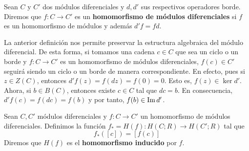 \begin{definicion}
	Sean $C$ y $C'$ dos módulos diferenciales y $d, d'$ sus respectivos operadores borde. Diremos que $f: C \rightarrow C'$ es un \textbf{homomorfismo de módulos diferenciales} si $f$ es un homomorfismo de módulos y además $d'f = fd$.
\end{definicion}

La anterior definición nos permite preservar la estructura algebraica del módulo diferencial. De esta forma, si tomamos una cadena $c \in C$ que sea un ciclo o un borde y $f:C \rightarrow C'$ es un homomorfismo de módulos diferenciales, $f(c) \in C'$ seguirá siendo un ciclo o un borde de manera correspondiente. En efecto, pues si $z \in Z(C)$, entonces $d'f(z) = f(dz) = f(0) = 0$. Esto es, $f(z) \in \ker d'$. Ahora, si $b \in B(C)$, entonces existe $c \in C$ tal que $dc = b$. En consecuencia, $d'f(c) = f(dc) = f(b)$ y por tanto, $f(b) \in \operatorname{Im} d'$.
%
\begin{definicion}
	Sean $C, C'$ módulos diferenciales y $f:C \rightarrow C'$ un homomorfismo de módulos diferenciales. Definimos la función $f_* = H(f): H(C;R) \rightarrow H(C';R)$ tal que 
	\[f_*([c]) = [f(c)] \]
	Diremos que $H(f)$ es el \textbf{homomorfismo inducido} por $f$.
\end{definicion}

